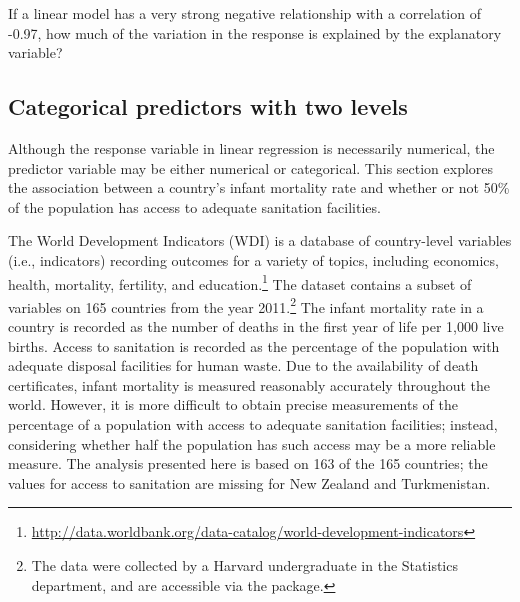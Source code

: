 \begin{exercisewrap}
\begin{nexercise}
If a linear model has a very strong negative relationship with a correlation of -0.97, how much of the variation in the response is explained by the explanatory variable?\footnotemark{}
\end{nexercise}
\end{exercisewrap}





\subsection{Categorical predictors with two levels}
\label{categoricalPredictorsWithTwoLevels}


Although the response variable in linear regression is necessarily numerical, the predictor variable may be either numerical or categorical. This section explores the association between a country's infant mortality rate and whether or not 50\% of the population has access to adequate sanitation facilities. 

The World Development Indicators (WDI) is a database of country-level variables (i.e., indicators) recording outcomes for a variety of topics, including economics, health, mortality, fertility, and education.\footnote{\url{http://data.worldbank.org/data-catalog/world-development-indicators}} The dataset  contains a subset of variables on 165 countries from the year 2011.\footnote{The data were collected by a Harvard undergraduate in the Statistics department, and are accessible via the  package.} The infant mortality rate in a country is recorded as the number of deaths in the first year of life per 1,000 live births. Access to sanitation is recorded as the percentage of the population with adequate disposal facilities for human waste. Due to the availability of death certificates, infant mortality is measured reasonably accurately throughout the world. However, it is more difficult to obtain precise measurements of the percentage of a population with access to adequate sanitation facilities; instead, considering whether half the population has such access may be a more reliable measure. The analysis presented here is based on 163 of the 165 countries; the values for access to sanitation are missing for New Zealand and Turkmenistan.

